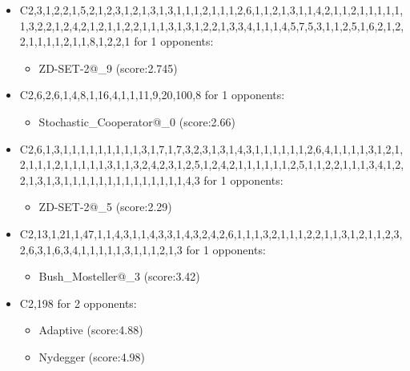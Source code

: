 \begin{appendices}
\begin{itemize}
        \item C2,3,1,2,2,1,5,2,1,2,3,1,2,1,3,1,3,1,1,1,2,1,1,1,2,6,1,1,2,1,3,1,1,4,2,1,1,2,1,1,1,1,1,1,3,2,2,1,2,4,2,1,2,1,1,2,2,1,1,1,3,1,3,1,2,2,1,3,3,4,1,1,1,4,5,7,5,3,1,1,2,5,1,6,2,1,2,2,1,1,1,1,2,1,1,8,1,2,2,1 for 1 opponents:
        \begin{multicols}{3}
            \begin{itemize}
                \item ZD-SET-2@\_9 (score:2.745)
            \end{itemize}
        \end{multicols}

        \item C2,6,2,6,1,4,8,1,16,4,1,1,11,9,20,100,8 for 1 opponents:
        \begin{multicols}{3}
            \begin{itemize}
                \item Stochastic\_Cooperator@\_0 (score:2.66)
            \end{itemize}
        \end{multicols}

        \item C2,6,1,3,1,1,1,1,1,1,1,1,1,3,1,7,1,7,3,2,3,1,3,1,4,3,1,1,1,1,1,1,2,6,4,1,1,1,1,3,1,2,1,2,1,1,1,2,1,1,1,1,1,3,1,1,3,2,4,2,3,1,2,5,1,2,4,2,1,1,1,1,1,1,2,5,1,1,2,2,1,1,1,3,4,1,2,2,1,3,1,3,1,1,1,1,1,1,1,1,1,1,1,1,1,1,4,3 for 1 opponents:
        \begin{multicols}{3}
            \begin{itemize}
                \item ZD-SET-2@\_5 (score:2.29)
            \end{itemize}
        \end{multicols}

        \item C2,13,1,21,1,47,1,1,4,3,1,1,4,3,3,1,4,3,2,4,2,6,1,1,1,3,2,1,1,1,2,2,1,1,3,1,2,1,1,2,3,2,6,3,1,6,3,4,1,1,1,1,1,3,1,1,1,2,1,3 for 1 opponents:
        \begin{multicols}{3}
            \begin{itemize}
                \item Bush\_Mosteller@\_3 (score:3.42)
            \end{itemize}
        \end{multicols}

        \item C2,198 for 2 opponents:
        \begin{multicols}{3}
            \begin{itemize}
                \item Adaptive (score:4.88)
                \item Nydegger (score:4.98)
            \end{itemize}
        \end{multicols}


\end{itemize}
\end{appendices}
